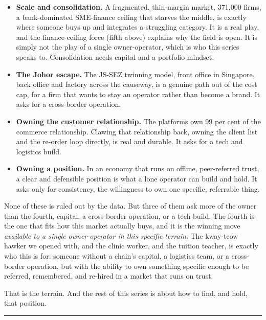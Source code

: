 \documentclass[10pt,twoside,openany]{memoir}
\begin{document}
{{{{{{{{{{{{{{\begin{itemize}
\tightlist
\item
  \textbf{Scale and consolidation.} A fragmented, thin-margin market,
  371,000 firms, a bank-dominated SME-finance ceiling that starves the
  middle, is exactly where someone buys up and integrates a struggling
  category. It is a real play, and the finance-ceiling force (fifth
  above) explains why the field is open. It is simply not the play of a
  single owner-operator, which is who this series speaks to.
  Consolidation needs capital and a portfolio mindset.
\item
  \textbf{The Johor escape.} The JS-SEZ twinning model, front office in
  Singapore, back office and factory across the causeway, is a genuine
  path out of the cost cap, for a firm that wants to stay an operator
  rather than become a brand. It asks for a cross-border operation.
\item
  \textbf{Owning the customer relationship.} The platforms own 99 per
  cent of the commerce relationship. Clawing that relationship back,
  owning the client list and the re-order loop directly, is real and
  durable. It asks for a tech and logistics build.
\item
  \textbf{Owning a position.} In an economy that runs on offline,
  peer-referred trust, a clear and defensible position is what a lone
  operator can build and hold. It asks only for consistency, the
  willingness to own one specific, referrable thing.
\end{itemize}

None of these is ruled out by the data. But three of them ask more of
the owner than the fourth, capital, a cross-border operation, or a tech
build. The fourth is the one that fits how this market actually buys,
and it is the winning move \emph{available to a single owner-operator in
this specific terrain}. The kway-teow hawker we opened with, and the
clinic worker, and the tuition teacher, is exactly who this is for:
someone without a chain's capital, a logistics team, or a cross-border
operation, but with the ability to own something specific enough to be
referred, remembered, and re-hired in a market that runs on trust.

That is the terrain. And the rest of this series is about how to find,
and hold, that position.

\begin{center}\rule{0.5\linewidth}{0.5pt}\end{center}

\FloatBarrier
}}}}}}}}}}}}}}
\end{document}
